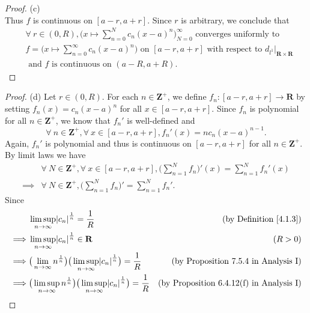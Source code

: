\begin{proof}{(c)}
\[    \]
    Thus \(f\) is continuous on \([a - r, a + r]\).
    Since \(r\) is arbitrary, we conclude that
    \begin{align*}
         & \forall\ r \in (0, R), \bigg(x \mapsto \sum_{n = 0}^N c_n (x - a)^n\bigg)_{N = 0}^\infty \text{ converges uniformly to }                                \\
         & f = \bigg(x \mapsto \sum_{n = 0}^\infty c_n (x - a)^n\bigg) \text{ on } [a - r, a + r] \text{ with respect to } d_{l^1}|_{\mathbf{R} \times \mathbf{R}} \\
         & \text{ and } f \text{ is continuous on } (a - R, a + R).
    \end{align*}
\end{proof}

\begin{proof}{(d)}
    Let \(r \in (0, R)\).
    For each \(n \in \mathbf{Z}^+\), we define \(f_n : [a - r, a + r] \to \mathbf{R}\) by setting \(f_n(x) = c_n (x - a)^n\) for all \(x \in [a - r, a + r]\).
    Since \(f_n\) is polynomial for all \(n \in \mathbf{Z}^+\), we know that \(f_n'\) is well-defined and
    \[
        \forall\ n \in \mathbf{Z}^+, \forall\ x \in [a - r, a + r], f_n'(x) = n c_n (x - a)^{n - 1}.
    \]
    Again, \(f_n'\) is polynomial and thus is continuous on \([a - r, a + r]\) for all \(n \in \mathbf{Z}^+\).
    By limit laws we have
    \begin{align*}
                 & \forall\ N \in \mathbf{Z}^+, \forall\ x \in [a - r, a + r], \bigg(\sum_{n = 1}^N f_n\bigg)'(x) = \sum_{n = 1}^N f_n'(x) \\
        \implies & \forall\ N \in \mathbf{Z}^+, \bigg(\sum_{n = 1}^N f_n\bigg)' = \sum_{n = 1}^N f_n'.
    \end{align*}
    Since
    \begin{align*}
                 & \limsup_{n \to \infty} \abs*{c_n}^{\frac{1}{n}} = \frac{1}{R}                                                            & \text{(by Definition \ref{4.1.3})}              \\
        \implies & \limsup_{n \to \infty} \abs*{c_n}^{\frac{1}{n}} \in \mathbf{R}                                                           & (R > 0)                                         \\
        \implies & \big(\lim_{n \to \infty} n^{\frac{1}{n}}\big) \big(\limsup_{n \to \infty} \abs*{c_n}^{\frac{1}{n}}\big) = \frac{1}{R}    & \text{(by Proposition 7.5.4 in Analysis I)}     \\
        \implies & \big(\limsup_{n \to \infty} n^{\frac{1}{n}}\big) \big(\limsup_{n \to \infty} \abs*{c_n}^{\frac{1}{n}}\big) = \frac{1}{R} & \text{(by Proposition 6.4.12(f) in Analysis I)} \\

\end{align*}
\end{proof}
